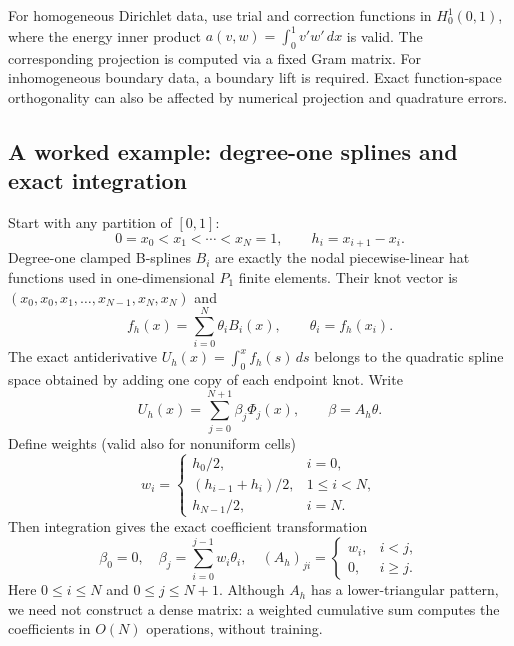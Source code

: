 For homogeneous Dirichlet data, use trial and correction functions in
$H_0^1(0,1)$, where the energy inner product
$a(v,w)=\int_0^1v'w'\,dx$ is valid. The corresponding projection is
computed via a fixed Gram matrix. For inhomogeneous boundary data,
a boundary lift is required. Exact function-space orthogonality can
also be affected by numerical projection and quadrature errors.





\subsection{A worked example: degree-one splines and exact integration}
\label{sec:scho-concrete-integration}

Start with any partition of $[0,1]$:
\begin{equation}
  0=x_0<x_1<\cdots<x_N=1,\qquad h_i=x_{i+1}-x_i.
\end{equation}
Degree-one clamped B-splines $B_i$ are exactly the nodal
piecewise-linear hat functions used in one-dimensional $P_1$
finite elements. Their knot vector is
$(x_0,x_0,x_1,\ldots,x_{N-1},x_N,x_N)$ and
\begin{equation}
  f_h(x)=\sum_{i=0}^{N}\theta_i B_i(x),
  \qquad \theta_i=f_h(x_i).
\end{equation}
The exact antiderivative $U_h(x)=\int_0^x f_h(s)\,ds$
belongs to the quadratic spline space obtained by adding
one copy of each endpoint knot. Write
\begin{equation}
  U_h(x)=\sum_{j=0}^{N+1}\beta_j\Phi_j(x),
  \qquad \beta=A_h\theta.
\end{equation}
Define weights (valid also for nonuniform cells)
\begin{equation}
  w_i=\begin{cases}
    h_0/2,           & i=0,       \\
    (h_{i-1}+h_i)/2, & 1\leq i<N, \\
    h_{N-1}/2,       & i=N.
  \end{cases}
\end{equation}
Then integration gives the exact coefficient transformation
\begin{equation}
  \boxed{
    \beta_0=0,\quad
    \beta_j=\sum_{i=0}^{j-1}w_i\theta_i,\quad
    (A_h)_{ji}=\begin{cases}w_i,&i<j,\\0,&i\geq j.\end{cases}}
  \label{eq:scho-weighted-prefix}
\end{equation}
Here $0\leq i\leq N$ and $0\leq j\leq N+1$.
Although $A_h$ has a lower-triangular pattern, we need not
construct a dense matrix: a weighted cumulative sum computes
the coefficients in $O(N)$ operations, without training.

